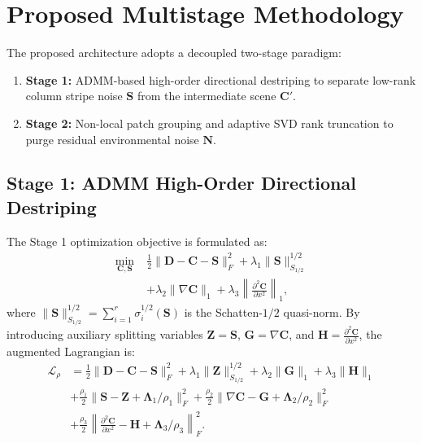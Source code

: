 \documentclass[journal]{IEEEtran}
\begin{document}
\section{Proposed Multistage Methodology}
\label{sec:methodology}

The proposed architecture adopts a decoupled two-stage paradigm:
\begin{enumerate}
    \item \textbf{Stage 1:} ADMM-based high-order directional destriping to separate low-rank column stripe noise $\mathbf{S}$ from the intermediate scene $\mathbf{C}'$.
    \item \textbf{Stage 2:} Non-local patch grouping and adaptive SVD rank truncation to purge residual environmental noise $\mathbf{N}$.
\end{enumerate}

\subsection{Stage 1: ADMM High-Order Directional Destriping}
The Stage 1 optimization objective is formulated as:
\begin{equation}
\begin{aligned}
    \min_{\mathbf{C}, \mathbf{S}} \; &\frac{1}{2} \|\mathbf{D} - \mathbf{C} - \mathbf{S}\|_F^2 + \lambda_1 \|\mathbf{S}\|_{S_{1/2}}^{1/2} \\
    &+ \lambda_2 \|\nabla \mathbf{C}\|_1 + \lambda_3 \left\| \frac{\partial^2 \mathbf{C}}{\partial x^2} \right\|_1,
\end{aligned}
\label{eq:stage1_obj}
\end{equation}
where $\|\mathbf{S}\|_{S_{1/2}}^{1/2} = \sum_{i=1}^r \sigma_i^{1/2}(\mathbf{S})$ is the Schatten-$1/2$ quasi-norm. By introducing auxiliary splitting variables $\mathbf{Z} = \mathbf{S}$, $\mathbf{G} = \nabla \mathbf{C}$, and $\mathbf{H} = \frac{\partial^2 \mathbf{C}}{\partial x^2}$, the augmented Lagrangian is:
\begin{equation}
\begin{aligned}
    \mathcal{L}_\rho &= \frac{1}{2}\|\mathbf{D} - \mathbf{C} - \mathbf{S}\|_F^2 + \lambda_1 \|\mathbf{Z}\|_{S_{1/2}}^{1/2} + \lambda_2 \|\mathbf{G}\|_1 + \lambda_3 \|\mathbf{H}\|_1 \\
    &+ \frac{\rho_1}{2} \|\mathbf{S} - \mathbf{Z} + \mathbf{\Lambda}_1/\rho_1\|_F^2 + \frac{\rho_2}{2} \|\nabla \mathbf{C} - \mathbf{G} + \mathbf{\Lambda}_2/\rho_2\|_F^2 \\
    &+ \frac{\rho_3}{2} \left\| \frac{\partial^2 \mathbf{C}}{\partial x^2} - \mathbf{H} + \mathbf{\Lambda}_3/\rho_3 \right\|_F^2.
\end{aligned}
\label{eq:augmented_lagrangian}
\end{equation}
\end{document}
